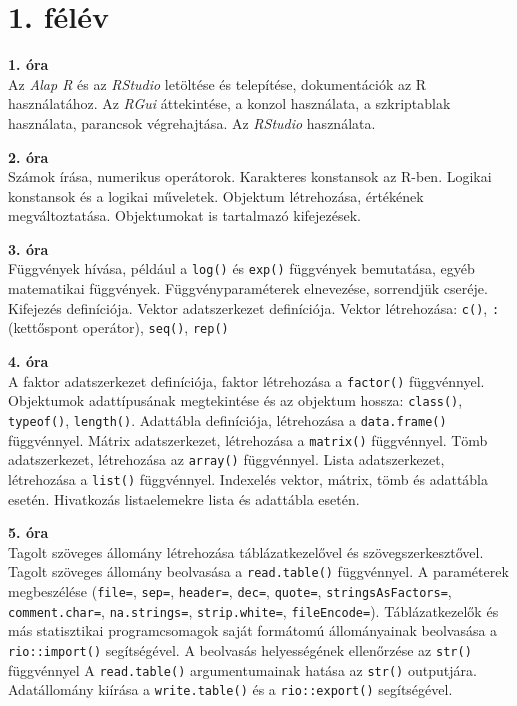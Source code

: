\documentclass[
]{book}
\begin{document}
\hypertarget{felev-1}{%
\section*{1. félév}\label{felev-1}}

\textbf{1. óra}\\
Az \emph{Alap R} és az \emph{RStudio} letöltése és telepítése, dokumentációk az
R használatához. Az \emph{RGui} áttekintése, a konzol használata, a
szkriptablak használata, parancsok végrehajtása. Az \emph{RStudio}
használata.

\textbf{2. óra}\\
Számok írása, numerikus operátorok. Karakteres konstansok az R-ben.
Logikai konstansok és a logikai műveletek. Objektum létrehozása, értékének megváltoztatása. Objektumokat is tartalmazó kifejezések.

\textbf{3. óra}\\
Függvények hívása, például a \texttt{log()} és \texttt{exp()} függvények bemutatása, egyéb matematikai függvények. Függvényparaméterek elnevezése, sorrendjük cseréje. Kifejezés definíciója. Vektor adatszerkezet definíciója. Vektor létrehozása: \texttt{c()}, \texttt{:} (kettőspont operátor), \texttt{seq()}, \texttt{rep()}

\textbf{4. óra}\\
A faktor adatszerkezet definíciója, faktor létrehozása a \texttt{factor()} függvénnyel. Objektumok adattípusának megtekintése és az objektum hossza: \texttt{class()}, \texttt{typeof()}, \texttt{length()}. Adattábla definíciója, létrehozása a \texttt{data.frame()} függvénnyel. Mátrix adatszerkezet, létrehozása a \texttt{matrix()} függvénnyel. Tömb adatszerkezet, létrehozása az \texttt{array()} függvénnyel. Lista adatszerkezet, létrehozása a \texttt{list()} függvénnyel. Indexelés vektor, mátrix, tömb és adattábla esetén. Hivatkozás listaelemekre lista és adattábla esetén.

\textbf{5. óra}\\
Tagolt szöveges állomány létrehozása táblázatkezelővel és szövegszerkesztővel. Tagolt szöveges állomány beolvasása a \texttt{read.table()} függvénnyel. A paraméterek megbeszélése (\texttt{file=}, \texttt{sep=}, \texttt{header=}, \texttt{dec=}, \texttt{quote=}, \texttt{stringsAsFactors=}, \texttt{comment.char=}, \texttt{na.strings=}, \texttt{strip.white=}, \texttt{fileEncode=}). Táblázatkezelők és más statisztikai programcsomagok saját formátomú állományainak beolvasása a \texttt{rio::import()} segítségével. A beolvasás helyességének ellenőrzése az \texttt{str()} függvénnyel A \texttt{read.table()} argumentumainak hatása az \texttt{str()} outputjára. Adatállomány kiírása a \texttt{write.table()} és a \texttt{rio::export()} segítségével.
\end{document}
